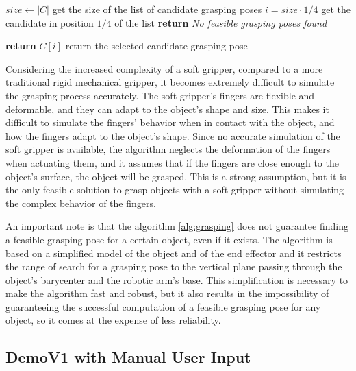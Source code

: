 \begin{algorithm}[H]
\begin{algorithmic}[1]
    \State $size \gets |C|$ \Comment get the size of the list of candidate grasping poses
        \State $i = size \cdot 1/4$ \Comment get the candidate in position $1/4$ of the list
    \Else 
        \State \textbf{return} \textit{No feasible grasping poses found}
    \EndIf 

    \State \textbf{return} $C[i]$ \Comment return the selected candidate grasping pose

    \end{algorithmic}
\end{algorithm}

Considering the increased complexity of a soft gripper, compared to a more traditional rigid mechanical gripper,
it becomes extremely difficult to simulate the grasping process accurately. The soft gripper's fingers are
flexible and deformable, and they can adapt to the object's shape and size. This makes it difficult to simulate
the fingers' behavior when in contact with the object, and how the fingers adapt to the object's shape.
Since no accurate simulation of the soft gripper is available, the algorithm neglects the deformation of the
fingers when actuating them, and it assumes that if the fingers are close enough to the object's surface,
the object will be grasped. This is a strong assumption, but it is the only feasible solution to grasp objects
with a soft gripper without simulating the complex behavior of the fingers.

An important note is that the algorithm \ref{alg:grasping} does not guarantee finding a feasible grasping
pose for a certain object, even if it exists. 
The algorithm is based on a simplified model of the object and of the end effector and it
restricts the range of search for a grasping pose to the vertical plane passing through the object's barycenter
and the robotic arm's base. This simplification is necessary to make the algorithm fast and robust, but it
also results in the impossibility of guaranteeing the successful computation of a feasible grasping pose
for any object, so it comes at the expense of less reliability.

\subsection{DemoV1 with Manual User Input}

